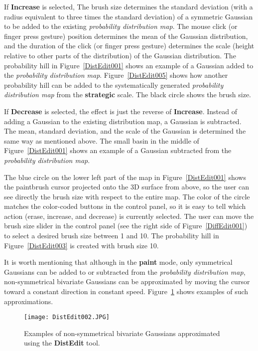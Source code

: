 If \textbf{Increase} is selected, The brush size determines the standard deviation (with a radius equivalent to three times the standard deviation) of a symmetric Gaussian to be added to the existing \textit{probability distribution map}. The mouse click (or finger press gesture) position determines the mean of the Gaussian distribution, and the duration of the click (or finger press gesture) determines the scale (height relative to other parts of the distribution) of the Gaussian distribution. The probability hill in Figure~\ref{DistEdit001} shows an example of a Gaussian added to the \textit{probability distribution map}. Figure~\ref{DistEdit005} shows how another probability hill can be added to the systematically generated \textit{probability distribution map} from the \textbf{strategic} scale. The black circle shows the brush size.

If \textbf{Decrease} is selected, the effect is just the reverse of \textbf{Increase}. Instead of adding a Gaussian to the existing distribution map, a Gaussian is subtracted. The mean, standard deviation, and the scale of the Gaussian is determined the same way as mentioned above. The small basin in the middle of Figure~\ref{DistEdit001} shows an example of a Gaussian subtracted from the \textit{probability distribution map}.

The blue circle on the lower left part of the map in Figure~\ref{DistEdit001} shows the paintbrush cursor projected onto the 3D surface from above, so the user can see directly the brush size with respect to the entire map. The color of the circle matches the color-coded buttons in the control panel, so it is easy to tell which action (erase, increase, and decrease) is currently selected. The user can move the brush size slider in the control panel (see the right side of Figure~\ref{DiffEdit001}) to select a desired brush size between 1 and 10. The probability hill in Figure~\ref{DistEdit003} is created with brush size 10.

It is worth mentioning that although in the \textbf{paint} mode, only symmetrical Gaussians can be added to or subtracted from the \textit{probability distribution map}, non-symmetrical bivariate Gaussians can be approximated by moving the cursor toward a constant direction in constant speed. Figure~\ref{DistEdit002} shows examples of such approximations.

\begin{figure}[!ht]
\centering
\texttt{[image: DistEdit002.JPG]}
\caption{Examples of non-symmetrical bivariate Gaussians approximated using the \textbf{DistEdit} tool.}
\label{DistEdit002}
\end{figure}

